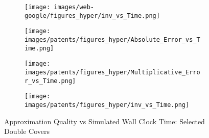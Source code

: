 \begin{figure*}[htbp]
\begin{subfigure}[b]{\textwidth}
\begin{minipage}[b]{0.3\textwidth}
		\texttt{[image: images/web-google/figures\_hyper/inv\_vs\_Time.png]} %
	\end{minipage}
\end{subfigure}
%
\begin{subfigure}[b]{\textwidth}
		\centering
		\begin{minipage}[b]{0.05\textwidth}
			\centering
		\end{minipage}%
		\begin{minipage}[b]{0.3\textwidth}
			\centering
			\texttt{[image: images/patents/figures\_hyper/Absolute\_Error\_vs\_Time.png]} %
			
		\end{minipage}%
		\begin{minipage}[b]{0.3\textwidth}
			\centering
			\texttt{[image: images/patents/figures\_hyper/Multiplicative\_Error\_vs\_Time.png]} %
			
		\end{minipage}%
		\begin{minipage}[b]{0.3\textwidth}
			\centering
			\texttt{[image: images/patents/figures\_hyper/inv\_vs\_Time.png]} %
		\end{minipage}
	\end{subfigure}
%
	\caption{Approximation Quality vs Simulated Wall Clock Time: Selected Double Covers}
	\label{fig:erros_hyper_time}
\end{figure*}




